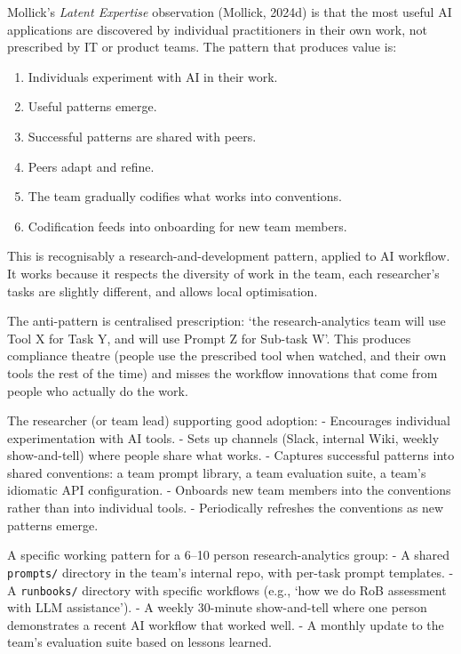 \documentclass[
  letterpaper,
  11pt]{scrbook}
\providecommand{\tightlist}{%
  \setlength{\itemsep}{0pt}\setlength{\parskip}{0pt}}
\begin{document}
Mollick's \emph{Latent Expertise} observation (Mollick, 2024d) is that
the most useful AI applications are discovered by individual
practitioners in their own work, not prescribed by IT or product teams.
The pattern that produces value is:

\begin{enumerate}
\def\labelenumi{\arabic{enumi}.}
\tightlist
\item
  Individuals experiment with AI in their work.
\item
  Useful patterns emerge.
\item
  Successful patterns are shared with peers.
\item
  Peers adapt and refine.
\item
  The team gradually codifies what works into conventions.
\item
  Codification feeds into onboarding for new team members.
\end{enumerate}

This is recognisably a research-and-development pattern, applied to AI
workflow. It works because it respects the diversity of work in the
team, each researcher's tasks are slightly different, and allows local
optimisation.

The anti-pattern is centralised prescription: `the research-analytics
team will use Tool X for Task Y, and will use Prompt Z for Sub-task W'.
This produces compliance theatre (people use the prescribed tool when
watched, and their own tools the rest of the time) and misses the
workflow innovations that come from people who actually do the work.

The researcher (or team lead) supporting good adoption: - Encourages
individual experimentation with AI tools. - Sets up channels (Slack,
internal Wiki, weekly show-and-tell) where people share what works. -
Captures successful patterns into shared conventions: a team prompt
library, a team evaluation suite, a team's idiomatic API configuration.
- Onboards new team members into the conventions rather than into
individual tools. - Periodically refreshes the conventions as new
patterns emerge.

A specific working pattern for a 6--10 person research-analytics group:
- A shared \texttt{prompts/} directory in the team's internal repo, with
per-task prompt templates. - A \texttt{runbooks/} directory with
specific workflows (e.g., `how we do RoB assessment with LLM
assistance'). - A weekly 30-minute show-and-tell where one person
demonstrates a recent AI workflow that worked well. - A monthly update
to the team's evaluation suite based on lessons learned.
\end{document}
